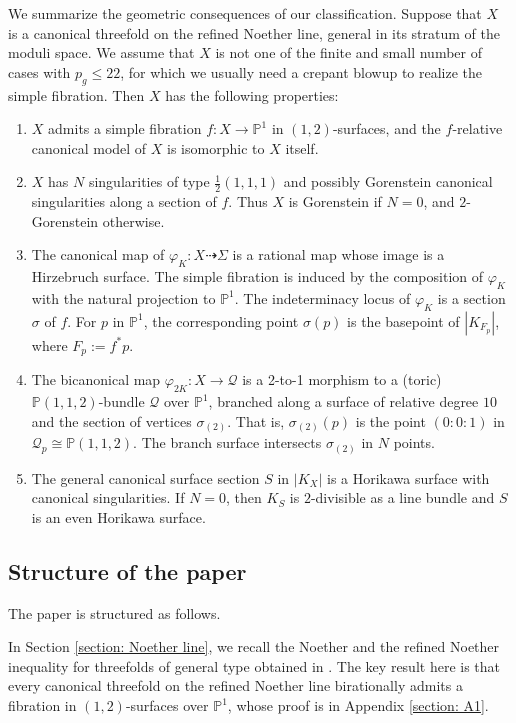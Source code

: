\documentclass[a4paper,11pt]{amsart}
\newcommand{\PP}{\ensuremath{\mathbb{P}}}
\theoremstyle{definition}
\theoremstyle{remark}
\numberwithin{equation}{section}
\begin{document}
We summarize the geometric consequences of our classification. Suppose that $X$ is a canonical threefold on the refined Noether line, general in its stratum of the moduli space. We assume that $X$ is not one of the finite and small number of cases with $p_g \le 22$, for which we usually need a crepant blowup to realize the simple fibration. Then $X$ has the following properties:

\begin{enumerate}
	\item $X$ admits a simple fibration $f\colon X\to \PP^1$ in $(1,2)$-surfaces, and the $f$-relative canonical model of $X$ is isomorphic to $X$ itself.
	
	\item $X$ has $N$ singularities of type $\frac12(1,1,1)$ and possibly Gorenstein canonical singularities along a section of $f$. Thus $X$ is Gorenstein if $N=0$, and $2$-Gorenstein otherwise.
	
	\item The canonical map of $\varphi_{K}\colon X\dashrightarrow \Sigma$ is a rational map whose image is a Hirzebruch surface. The simple fibration is induced by the composition of $\varphi_K$ with the natural projection to $\PP^1$. The indeterminacy locus of $\varphi_K$ is a section $\sigma$ of $f$. For $p$ in $\PP^1$, the corresponding point $\sigma(p)$ is the basepoint of $|K_{F_p}|$, where $F_p := f^*p$.
	
	\item The bicanonical map $\varphi_{2K}\colon X\to\mathcal{Q}$ is a 2-to-1 morphism to a (toric) $\PP(1,1,2)$-bundle $\mathcal{Q}$ over $\PP^1$, branched along a surface of relative degree $10$ and the section of vertices $\sigma_{(2)}$. That is, $\sigma_{(2)}(p)$ is the point $(0:0:1)$ in $\mathcal{Q}_p \cong\PP(1,1,2)$. The branch surface intersects $\sigma_{(2)}$ in $N$ points.
	
	\item The general canonical surface section $S$ in $|K_X|$ is a Horikawa surface with canonical singularities. If $N=0$, then $K_S$ is $2$-divisible as a line bundle and $S$ is an even Horikawa surface.
\end{enumerate}

\subsection{Structure of the paper}
The paper is structured as follows.

In Section \ref{section: Noether line}, we recall the Noether and the refined Noether inequality for threefolds of general type obtained in \cite{CCJ,CCJAdd,CHJ,HZ}. The key result here is that every canonical threefold on the refined Noether line birationally admits a fibration in $(1, 2)$-surfaces over $\PP^1$, whose proof is in Appendix \ref{section: A1}.
\end{document}
